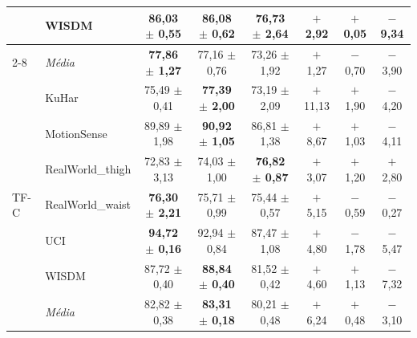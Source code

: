 \documentclass[border=8pt,varwidth=\maxdimen]{standalone}
\begin{document}
\begin{tabular}{llcccccc}
 & WISDM           & 86{,}03 $\pm$ 0{,}55 & \textbf{86{,}08 $\pm$ 0{,}62} & 76{,}73 $\pm$ 2{,}64 & $+$2{,}92 & $+$0{,}05 & $-$9{,}34\\
\cmidrule(lr){2-8}
 & \textit{Média}    & \textbf{77{,}86 $\pm$ 1{,}27} & 77{,}16 $\pm$ 0{,}76 & 73{,}26 $\pm$ 1{,}92 & $+$1{,}27 & $-$0{,}70 & $-$3{,}90\\
\midrule
\multirow{7}{*}{TF-C}
 & KuHar           & 75{,}49 $\pm$ 0{,}41 & \textbf{77{,}39 $\pm$ 2{,}00} & 73{,}19 $\pm$ 2{,}09 & $+$11{,}13 & $+$1{,}90 & $-$4{,}20\\
 & MotionSense     & 89{,}89 $\pm$ 1{,}98 & \textbf{90{,}92 $\pm$ 1{,}05} & 86{,}81 $\pm$ 1{,}38 & $+$8{,}67 & $+$1{,}03 & $-$4{,}11\\
 & RealWorld\_thigh& 72{,}83 $\pm$ 3{,}13 & 74{,}03 $\pm$ 1{,}00 & \textbf{76{,}82 $\pm$ 0{,}87} & $+$3{,}07 & $+$1{,}20 & $+$2{,}80\\
 & RealWorld\_waist& \textbf{76{,}30 $\pm$ 2{,}21} & 75{,}71 $\pm$ 0{,}99 & 75{,}44 $\pm$ 0{,}57 & $+$5{,}15 & $-$0{,}59 & $-$0{,}27\\
 & UCI             & \textbf{94{,}72 $\pm$ 0{,}16} & 92{,}94 $\pm$ 0{,}84 & 87{,}47 $\pm$ 1{,}08 & $+$4{,}80 & $-$1{,}78 & $-$5{,}47\\
 & WISDM           & 87{,}72 $\pm$ 0{,}40 & \textbf{88{,}84 $\pm$ 0{,}40} & 81{,}52 $\pm$ 0{,}42 & $+$4{,}60 & $+$1{,}13 & $-$7{,}32\\
\cmidrule(lr){2-8}
 & \textit{Média}    & 82{,}82 $\pm$ 0{,}38 & \textbf{83{,}31 $\pm$ 0{,}18} & 80{,}21 $\pm$ 0{,}48 & $+$6{,}24 & $+$0{,}48 & $-$3{,}10\\
\bottomrule
\end{tabular}
\end{document}
